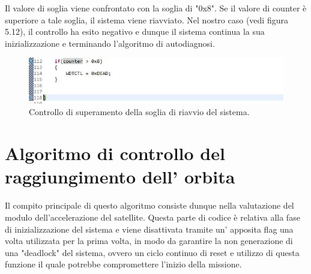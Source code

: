 \documentclass[LaM,binding=0.6cm]{../sapthesis}
\begin{document}
Il valore di soglia viene confrontato con la soglia di "0x8". Se il valore di counter è superiore a tale soglia, il sistema viene riavviato. Nel nostro caso (vedi figura 5.12), il controllo ha esito negativo e dunque il sistema continua la sua inizializzazione e terminando l'algoritmo di autodiagnosi.\newline

\begin{figure}[htbp]
\centerline{\includegraphics[scale=0.7]{examples/9_ControlloDelNumeroDiFaultNO_RIAVVIO.JPG}}
\caption{Controllo di superamento della soglia di riavvio del sistema.}
\label{fig}
\end{figure}


\newpage





\chapter{Algoritmo di controllo del raggiungimento dell' orbita}
Il compito principale di questo algoritmo consiste dunque nella valutazione del modulo dell’accelerazione del satellite. Questa parte di codice è relativa alla fase di inizializzazione del sistema e viene disattivata tramite un' apposita flag una volta utilizzata per la prima volta, in modo da garantire la non generazione di una "deadlock" del sistema, ovvero un ciclo continuo di reset e utilizzo di questa funzione il quale potrebbe compromettere l'inizio della missione.
\end{document}
